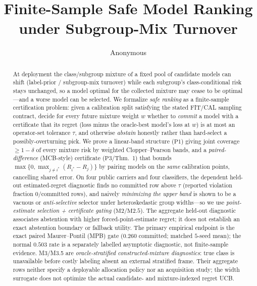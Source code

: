 \documentclass{article}
\title{Finite-Sample Safe Model Ranking under Subgroup-Mix Turnover}
\author{Anonymous}
\date{}
\begin{document}
\maketitle

\begin{abstract}
At deployment the class/subgroup mixture of a fixed pool of candidate models can shift
(label-prior / subgroup-mix turnover) while each subgroup's class-conditional risk stays
unchanged, so a model optimal for the collected mixture may cease to be optimal---and a
worse model can be selected. We formalize \emph{safe ranking} as a finite-sample
 certification problem: given a calibration split satisfying the stated FIT/CAL sampling
 contract, decide for every future mixture weight $w$
whether to \emph{commit} a model with a certificate that its regret (loss minus the
oracle-best model's loss at $w$) is at most an operator-set tolerance $\tau$, and otherwise
\emph{abstain} honestly rather than hard-select a possibly-overturning pick. We prove a
linear-band structure ($\mathrm{P1}$) giving joint coverage $\ge1-\delta$ of every mixture
risk by weighted Clopper--Pearson bands, and a \emph{paired-difference} (MCB-style)
certificate ($\mathrm{P3}$/Thm.~1) that bounds $\max\{0,\max_{j\ne i^*}(R_{i^*}-R_j)\}$ by pairing models on the
\emph{same} calibration points, cancelling shared error. On four public carriers and four
classifiers, the dependent held-out estimated-regret diagnostic finds no committed row above
$\tau$ (reported violation fraction $0/\text{committed rows}$), and
naively \emph{minimizing the upper band} is shown to be a vacuous or \emph{anti-selective}
selector under heteroskedastic group widths---so we use \emph{point-estimate selection +
 certificate gating} ($\mathrm{M2}$/$\mathrm{M2.5}$). The aggregate held-out diagnostic associates
 abstention with higher forced-point-estimate regret; it does not establish an exact abstention
 boundary or fallback utility. The primary empirical endpoint is the exact paired
 Maurer--Pontil (MPB) gate ($0.260$ committed; matched $5$-seed mean); the normal $0.503$ rate is
 a separately labelled asymptotic diagnostic, not finite-sample evidence.
M3/M3.5 are \emph{oracle-stratified constructed-mixture diagnostics}: true class is unavailable
before costly labeling absent an external stratified frame. Their aggregate rows neither specify a
deployable allocation policy nor an acquisition study; the width surrogate does not optimize the
actual candidate- and mixture-indexed regret UCB.
\end{abstract}
\end{document}
